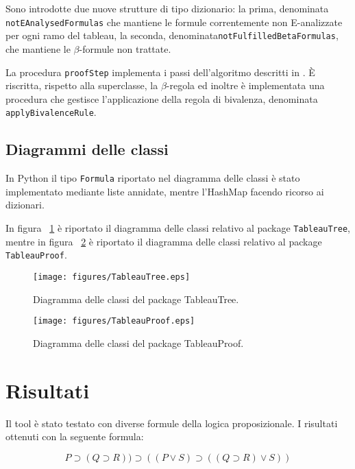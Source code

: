 \documentclass[12pt,a4paper]{article}
\theoremstyle{plain}
\theoremstyle{definition}
\theoremstyle{remark}
\begin{document}
Sono introdotte due nuove strutture di tipo dizionario: la prima, denominata \texttt{notEAnalysedFormulas} che mantiene
le formule correntemente non E-analizzate per ogni ramo del tableau, la seconda, denominata\linebreak\texttt{notFulfilledBetaFormulas},
che mantiene le $\beta$-formule non trattate.

La procedura \texttt{proofStep} implementa i passi dell'algoritmo descritti in \cite{d1994taming}. È riscritta, rispetto alla
superclasse, la $\beta$-regola ed inoltre è implementata una procedura che gestisce l'applicazione della regola di bivalenza,
denominata \texttt{applyBivalenceRule}.

\subsection*{Diagrammi delle classi}
In Python il tipo \texttt{Formula} riportato nel diagramma delle classi è stato implementato mediante liste annidate, mentre
l'HashMap facendo ricorso ai dizionari.

In figura \figurename~\ref{fig:TableauTree} è riportato il diagramma delle classi relativo al package \texttt{TableauTree},
mentre in figura \figurename~\ref{fig:TableauProof} è riportato il diagramma delle classi relativo al package
\texttt{TableauProof}.

\begin{figure}[H]
\centering
\linespread{1.0}
\texttt{[image: figures/TableauTree.eps]}
\caption[Diagramma delle classi del package TableauTree]{Diagramma delle classi del package TableauTree.}
\label{fig:TableauTree}
\end{figure}

\begin{figure}[H]
\centering
\linespread{1.0}
\texttt{[image: figures/TableauProof.eps]}
\caption[Diagramma delle classi del package TableauProof]{Diagramma delle classi del package TableauProof.}
\label{fig:TableauProof}
\end{figure}

\section*{Risultati}
Il tool è stato testato con diverse formule della logica proposizionale. I risultati ottenuti con la seguente
formula:

\begin{equation}
P\supset (Q\supset R)) \supset ((P\lor S) \supset ((Q\supset R)\lor S))
\label{eq:formula1}
\end{equation} 
\end{document}
